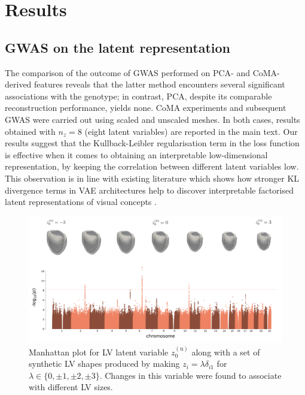 \section*{Results}
\subsection*{GWAS on the latent representation}
\label{subsec_GWAS}


The comparison of the outcome of GWAS performed on PCA- and CoMA-derived features reveals that the latter method encounters several significant associations with the genotype; in contrast, PCA, despite its comparable reconstruction performance, yields none. %
CoMA experiments and subsequent GWAS were carried out using scaled and unscaled meshes. In both cases, results obtained with $n_z=8$ (eight latent variables) are reported in the main text. Our results suggest that the Kullback-Leibler regularisation term in the loss function is effective when it comes to obtaining an interpretable low-dimensional representation, by keeping the correlation between different latent variables low. This observation is in line with existing literature which shows how stronger KL divergence terms in VAE architectures help to discover interpretable factorised latent representations of visual concepts \cite{ref_betavae}.

\begin{figure}[ht!]
\includegraphics[width=\textwidth]{figs/gwas/GWAS_Experiment2_z0u_unscaled_meshes.png}
\caption{Manhattan plot for LV latent variable $z_0^{(\text{u})}$ along with a set of synthetic LV shapes produced by making $z_i=\lambda \delta_{i1}$ for $\lambda\in\{0, \pm 1, \pm 2, \pm 3\}$. Changes in this variable were found to associate with different LV sizes.}
\label{fig:manhattan_LV_latent_unscaled}
\end{figure}


